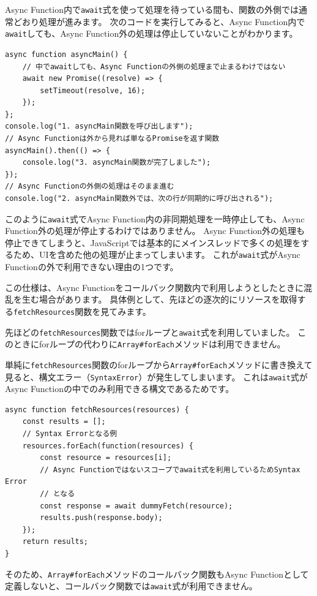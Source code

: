 Async
Function内で\texttt{await}式を使って処理を待っている間も、関数の外側では通常どおり処理が進みます。
次のコードを実行してみると、Async
Function内で\texttt{await}しても、Async
Function外の処理は停止していないことがわかります。

\begin{lstlisting}
async function asyncMain() {
    // 中でawaitしても、Async Functionの外側の処理まで止まるわけではない
    await new Promise((resolve) => {
        setTimeout(resolve, 16);
    });
};
console.log("1. asyncMain関数を呼び出します");
// Async Functionは外から見れば単なるPromiseを返す関数
asyncMain().then(() => {
    console.log("3. asyncMain関数が完了しました");
});
// Async Functionの外側の処理はそのまま進む
console.log("2. asyncMain関数外では、次の行が同期的に呼び出される");
\end{lstlisting}

このように\texttt{await}式でAsync
Function内の非同期処理を一時停止しても、Async
Function外の処理が停止するわけではありません。 Async
Function外の処理も停止できてしまうと、JavaScriptでは基本的にメインスレッドで多くの処理をするため、UIを含めた他の処理が止まってしまいます。
これが\texttt{await}式がAsync
Functionの外で利用できない理由の1つです。

この仕様は、Async
Functionをコールバック関数内で利用しようとしたときに混乱を生む場合があります。
具体例として、先ほどの逐次的にリソースを取得する\texttt{fetchResources}関数を見てみます。

先ほどの\texttt{fetchResources}関数ではforループと\texttt{await}式を利用していました。
このときにforループの代わりに\texttt{Array\#forEach}メソッドは利用できません。

単純に\texttt{fetchResources}関数のforループから\texttt{Array\#forEach}メソッドに書き換えて見ると、構文エラー（\texttt{SyntaxError}）が発生してしまいます。
これは\texttt{await}式がAsync
Functionの中でのみ利用できる構文であるためです。

\begin{lstlisting}
async function fetchResources(resources) {
    const results = [];
    // Syntax Errorとなる例
    resources.forEach(function(resources) {
        const resource = resources[i];
        // Async Functionではないスコープでawait式を利用しているためSyntax Error
        // となる
        const response = await dummyFetch(resource);
        results.push(response.body);
    });
    return results;
}
\end{lstlisting}

そのため、\texttt{Array\#forEach}メソッドのコールバック関数もAsync
Functionとして定義しないと、コールバック関数では\texttt{await}式が利用できません。


